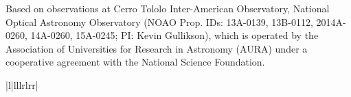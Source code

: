 \documentclass{emulateapj}
\begin{document}
Based on observations at Cerro Tololo Inter-American Observatory, National Optical Astronomy Observatory (NOAO Prop. IDs: 13A-0139, 13B-0112, 2014A-0260, 14A-0260, 15A-0245; PI: Kevin Gullikson), which is operated by the Association of Universities for Research in Astronomy (AURA) under a cooperative agreement with the National Science Foundation. 


     

\LongTables
\begin{deluxetable*}{|l|lllrlrr|}
\tabletypesize{\small}
\tablewidth{0pt}
       

\end{deluxetable*}
\end{document}

